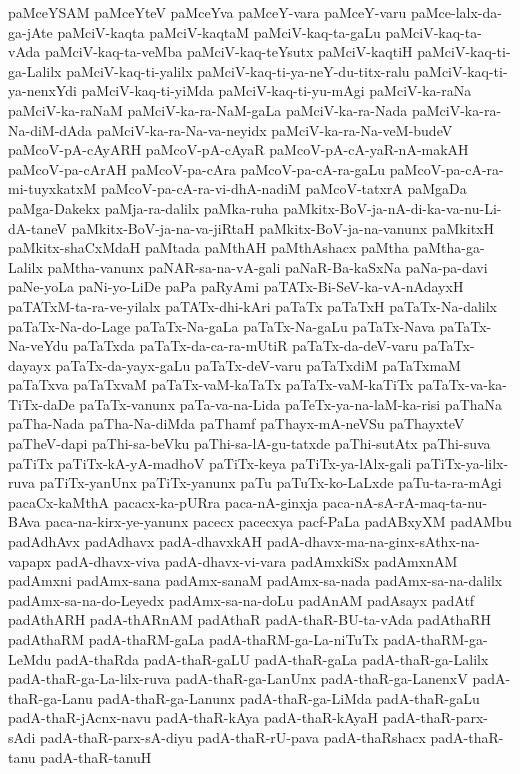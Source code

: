 {paMceYSAM
paMceYteV
paMceYva
paMceY-vara
paMceY-varu
paMce-lalx-da-ga-jAte
paMciV-kaqta
paMciV-kaqtaM
paMciV-kaq-ta-gaLu
paMciV-kaq-ta-vAda
paMciV-kaq-ta-veMba
paMciV-kaq-teYsutx
paMciV-kaqtiH
paMciV-kaq-ti-ga-Lalilx
paMciV-kaq-ti-yalilx
paMciV-kaq-ti-ya-neY-du-titx-ralu
paMciV-kaq-ti-ya-nenxYdi
paMciV-kaq-ti-yiMda
paMciV-kaq-ti-yu-mAgi
paMciV-ka-raNa
paMciV-ka-raNaM
paMciV-ka-ra-NaM-gaLa
paMciV-ka-ra-Nada
paMciV-ka-ra-Na-diM-dAda
paMciV-ka-ra-Na-va-neyidx
paMciV-ka-ra-Na-veM-budeV
paMcoV-pA-cAyARH
paMcoV-pA-cAyaR
paMcoV-pA-cA-yaR-nA-makAH
paMcoV-pa-cArAH
paMcoV-pa-cAra
paMcoV-pa-cA-ra-gaLu
paMcoV-pa-cA-ra-mi-tuyxkatxM
paMcoV-pa-cA-ra-vi-dhA-nadiM
paMcoV-tatxrA
paMgaDa
paMga-Dakekx
paMja-ra-dalilx
paMka-ruha
paMkitx-BoV-ja-nA-di-ka-va-nu-Li-dA-taneV
paMkitx-BoV-ja-na-va-jiRtaH
paMkitx-BoV-ja-na-vanunx
paMkitxH
paMkitx-shaCxMdaH
paMtada
paMthAH
paMthAshacx
paMtha
paMtha-ga-Lalilx
paMtha-vanunx
paNAR-sa-na-vA-gali
paNaR-Ba-kaSxNa
paNa-pa-davi
paNe-yoLa
paNi-yo-LiDe
paPa
paRyAmi
paTATx-Bi-SeV-ka-vA-nAdayxH
paTATxM-ta-ra-ve-yilalx
paTATx-dhi-kAri
paTaTx
paTaTxH
paTaTx-Na-dalilx
paTaTx-Na-do-Lage
paTaTx-Na-gaLa
paTaTx-Na-gaLu
paTaTx-Nava
paTaTx-Na-veYdu
paTaTxda
paTaTx-da-ca-ra-mUtiR
paTaTx-da-deV-varu
paTaTx-dayayx
paTaTx-da-yayx-gaLu
paTaTx-deV-varu
paTaTxdiM
paTaTxmaM
paTaTxva
paTaTxvaM
paTaTx-vaM-kaTaTx
paTaTx-vaM-kaTiTx
paTaTx-va-ka-TiTx-daDe
paTaTx-vanunx
paTa-va-na-Lida
paTeTx-ya-na-laM-ka-risi
paThaNa
paTha-Nada
paTha-Na-diMda
paThamf
paThayx-mA-neVSu
paThayxteV
paTheV-dapi
paThi-sa-beVku
paThi-sa-lA-gu-tatxde
paThi-sutAtx
paThi-suva
paTiTx
paTiTx-kA-yA-madhoV
paTiTx-keya
paTiTx-ya-lAlx-gali
paTiTx-ya-lilx-ruva
paTiTx-yanUnx
paTiTx-yanunx
paTu
paTuTx-ko-LaLxde
paTu-ta-ra-mAgi
pacaCx-kaMthA
pacacx-ka-pURra
paca-nA-ginxja
paca-nA-sA-rA-maq-ta-nu-BAva
paca-na-kirx-ye-yanunx
pacecx
pacecxya
pacf-PaLa
padABxyXM
padAMbu
padAdhAvx
padAdhavx
padA-dhavxkAH
padA-dhavx-ma-na-ginx-sAthx-na-vapapx
padA-dhavx-viva
padA-dhavx-vi-vara
padAmxkiSx
padAmxnAM
padAmxni
padAmx-sana
padAmx-sanaM
padAmx-sa-nada
padAmx-sa-na-dalilx
padAmx-sa-na-do-Leyedx
padAmx-sa-na-doLu
padAnAM
padAsayx
padAtf
padAthARH
padA-thARnAM
padAthaR
padA-thaR-BU-ta-vAda
padAthaRH
padAthaRM
padA-thaRM-gaLa
padA-thaRM-ga-La-niTuTx
padA-thaRM-ga-LeMdu
padA-thaRda
padA-thaR-gaLU
padA-thaR-gaLa
padA-thaR-ga-Lalilx
padA-thaR-ga-La-lilx-ruva
padA-thaR-ga-LanUnx
padA-thaR-ga-LanenxV
padA-thaR-ga-Lanu
padA-thaR-ga-Lanunx
padA-thaR-ga-LiMda
padA-thaR-gaLu
padA-thaR-jAcnx-navu
padA-thaR-kAya
padA-thaR-kAyaH
padA-thaR-parx-sAdi
padA-thaR-parx-sA-diyu
padA-thaR-rU-pava
padA-thaRshacx
padA-thaR-tanu
padA-thaR-tanuH
}
